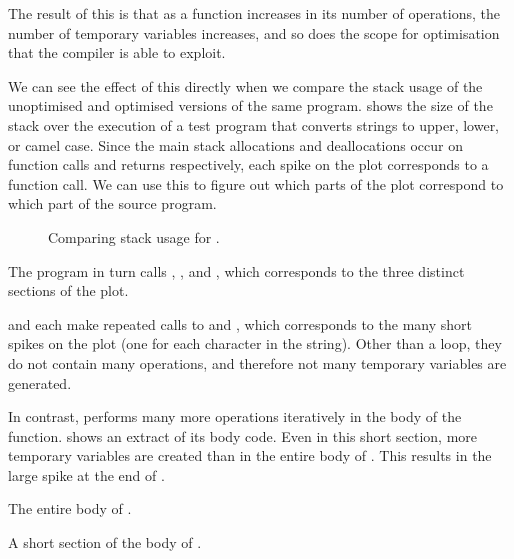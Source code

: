 \documentclass[00-main.tex]{subfiles}
\begin{document}
The result of this is that as a function increases in its number of operations, the number of temporary variables increases, and so does the scope for optimisation that the compiler is able to exploit.

We can see the effect of this directly when we compare the stack usage of the unoptimised and optimised versions of the same program.
 shows the size of the stack over the execution of a test program that converts strings to upper, lower, or camel case.
Since the main stack allocations and deallocations occur on function calls and returns respectively, each spike on the plot corresponds to a function call. We can use this to figure out which parts of the plot correspond to which part of the source program.

\begin{figure}[ht]
  \centering
  \caption{Comparing stack usage for .}
  \label{fig:comparing stack usage for case.c} %
\end{figure}

The program in turn calls , , and , which corresponds to the three distinct sections of the plot.

 and  each make repeated calls to  and , which corresponds to the many short spikes on the plot (one for each character in the string).
Other than a  loop, they do not contain many operations, and therefore not many temporary variables are generated.


In contrast,  performs many more operations iteratively in the body of the function.
 shows an extract of its body code.
Even in this short section, more temporary variables are created than in the entire body of .
This results in the large spike at the end of .

\begin{listing}[!ht]
  \caption{The entire body of .}
  \label{lst:caseupper body code}
\end{listing}

\begin{listing}[!ht]
  \caption{A short section of the body of .}
  \label{lst:section of casecamel body code}
\end{listing}
\end{document}
